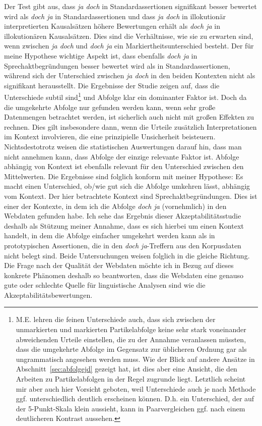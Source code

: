 Der Test gibt aus, dass \textit{ja doch} in Standardassertionen signifikant besser be\-wertet wird als \textit{doch ja} in Standardassertionen und dass \textit{ja doch} in illokutionär interpretierten Kausalsätzen höhere Bewertungen erhält als \textit{doch ja} in illokutionären Kausalsätzen. Dies sind die Verhältnisse, wie sie zu erwarten sind, wenn zwi\-schen \textit{ja doch} und \textit{doch ja} ein Markiertheitsunterschied  besteht. Der für meine Hypothese wichtige Aspekt ist, dass ebenfalls \textit{doch ja} in Sprechaktbegründungen  besser bewertet wird als in  Standardassertionen, während sich der Unterschied zwischen \textit{ja doch} in den beiden Kontexten nicht als signifikant herausstellt. Die Ergebnisse der Studie zeigen auf, dass die Unterschiede subtil sind\footnote{M.E. lehren die feinen Unterschiede auch, dass sich zwischen der unmarkierten und markierten Partikelabfolge keine sehr stark voneinander abweichenden Urteile einstellen, die zu der Annahme veranlassen müssten, dass die umgekehrte Abfolge im Gegensatz zur üblicheren Ordnung gar als ungrammatisch angesehen werden muss. Wie der Blick auf andere Ansätze in Abschnitt~\ref{sec:abfolgejd} gezeigt hat, ist dies aber eine Ansicht, die den Arbeiten zu Partikelabfolgen in der Regel zugrunde liegt. Letztlich scheint mir aber auch hier Vorsicht geboten, weil Unterschiede auch je nach Methode ggf. unterschiedlich deutlich erscheinen können. D.h. ein Unterschied, der auf der 5-Punkt-Skala klein aussieht, kann in Paarvergleichen ggf. nach einem deutlicheren Kontrast aussehen.} und \glq Abfolge\grq {}  klar ein dominanter Faktor ist. Doch da die umgekehrte Abfolge nur gefunden werden kann, wenn sehr große Datenmengen betrachtet werden, ist sicherlich auch nicht mit großen Effekten zu rechnen. Dies gilt insbesondere dann, wenn die Urteile zusätzlich Interpretationen im Kontext involvieren, die eine prinzi\-pielle Unsicherheit beisteuern. Nichtsdestotrotz weisen die statistischen Auswertungen darauf hin, dass man nicht annehmen kann, dass \glq Abfolge\grq {}  der einzige relevante Faktor ist. \glq Abfolge abhängig von Kontext\grq {} ist ebenfalls relevant für den Unterschied zwischen den Mittelwerten. Die Ergebnisse sind folglich konform mit meiner Hypothese: Es macht einen Unterschied, ob/wie gut sich die Abfolge umkehren lässt, abhängig vom Kontext. Der hier betrachtete Kontext sind Sprechaktbegründungen. Dies ist einer der Kontexte, in dem ich die Abfolge \textit{doch ja} (vornehmlich) in den Webdaten gefunden habe. Ich sehe das Ergebnis dieser Akzeptabilitätsstudie deshalb als Stützung meiner Annahme, dass es sich hierbei um einen Kontext handelt, in dem die Abfolge einfacher umgekehrt werden kann als in  prototypischen Assertionen, die in den \textit{doch ja}-Treffern aus den Korpusdaten nicht belegt sind. Beide Untersuchungen weisen folglich in die gleiche Richtung. Die Frage nach der Qualität der Webdaten möchte ich in Bezug auf dieses konkrete Phänomen deshalb so beantworten, dass die Webdaten eine genauso gute oder schlechte Quelle für linguistische Analysen sind wie die Akzeptabilitätsbewertungen. 

